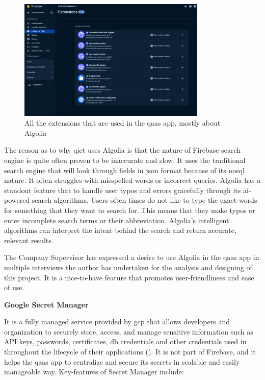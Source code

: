 \begin{figure}[H]
      \centering
      \includegraphics[width=0.8\textwidth]{Figures/Firebase/Extensions.png}
      \caption{All the extensions that are used in the \acrshort{qaas} app, mostly about Algolia}
\end{figure}

The reason as to why \acrshort{qict} uses Algolia is that the nature of Firebase search engine is quite often
proven to be inaccurate and slow. It uses the traditional search engine that will look through fields in
\acrshort{json} format because of its \acrshort{nosql} nature. It often struggles with misspelled words or
incorrect queries. Algolia has a standout feature that to handle user typos and errors gracefully
through its \acrshort{ai}-powered search algorithms. Users often-times do not like to type the exact words for
something that they want to search for. This means that they make typos or enter incomplete search terms or their
abbreviation. Algolia's intelligent algorithms can interpret the intent behind the search and return accurate,
relevant results.

The Company Supervisor has expressed a desire to use Algolia in the \acrshort{qaas} app in multiple interviews
the author has undertaken for the analysis and designing of this project. It is a nice-to-have feature that
promotes user-friendliness and ease of use.

\textbf{Google Secret Manager}

It is a fully managed service provided by \acrshort{gcp} that allows developers and organization to securely store,
access, and manage sensitive information such as API keys, passwords, certificates, \acrshort{db} credentials and other
credentials used in throughout the lifecycle of their applications
(\textit{\cite{googlesecretmanager}}). It is not part of Firebase, and it helps the \acrshort{qaas} app to centralize and
secure its secrets in scalable and easily manageable way. Key-features of Secret Manager include:

